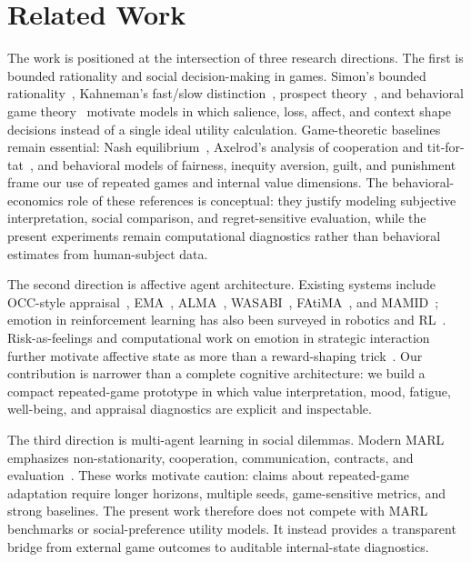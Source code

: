 \documentclass[runningheads]{llncs}
\begin{document}
\section{Related Work}
The work is positioned at the intersection of three research directions. The first is bounded rationality and social decision-making in games. Simon's bounded rationality~\cite{simon1955behavioral}, Kahneman's fast/slow distinction~\cite{kahneman2011thinking}, prospect theory~\cite{kahneman1979prospect}, and behavioral game theory~\cite{camerer2003behavioral} motivate models in which salience, loss, affect, and context shape decisions instead of a single ideal utility calculation. Game-theoretic baselines remain essential: Nash equilibrium~\cite{nash1950equilibrium}, Axelrod's analysis of cooperation and tit-for-tat~\cite{axelrod1984evolution}, and behavioral models of fairness, inequity aversion, guilt, and punishment~\cite{guth1982ultimatum,bolton2000erc,charness2002understanding,fehr1999theory,rabin1993fairness,battigalli2007guilt,battigalli2022belief,fehr2002punishment} frame our use of repeated games and internal value dimensions. The behavioral-economics role of these references is conceptual: they justify modeling subjective interpretation, social comparison, and regret-sensitive evaluation, while the present experiments remain computational diagnostics rather than behavioral estimates from human-subject data.

The second direction is affective agent architecture. Existing systems include OCC-style appraisal~\cite{ortony1988cognitive}, EMA~\cite{marsella2009ema}, ALMA~\cite{gebhard2005alma}, WASABI~\cite{beckerasano2010wasabi}, FAtiMA~\cite{dias2014fatima}, and MAMID~\cite{hudlicka2004mamid}; emotion in reinforcement learning has also been surveyed in robotics and RL~\cite{moerland2018emotion}. Risk-as-feelings and computational work on emotion in strategic interaction further motivate affective state as more than a reward-shaping trick~\cite{loewenstein2001risk}. Our contribution is narrower than a complete cognitive architecture: we build a compact repeated-game prototype in which value interpretation, mood, fatigue, well-being, and appraisal diagnostics are explicit and inspectable.

The third direction is multi-agent learning in social dilemmas. Modern MARL emphasizes non-stationarity, cooperation, communication, contracts, and evaluation~\cite{gronauer2022marl,zhu2024communication,ning2024survey,mu2024socialdilemmas,haupt2024contracts,willis2024reward,su2026iterated}. These works motivate caution: claims about repeated-game adaptation require longer horizons, multiple seeds, game-sensitive metrics, and strong baselines. The present work therefore does not compete with MARL benchmarks or social-preference utility models. It instead provides a transparent bridge from external game outcomes to auditable internal-state diagnostics.
\end{document}

